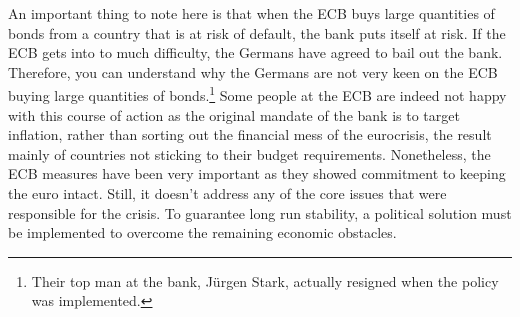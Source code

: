 \documentclass{tufte-handout}
\begin{document}
An important thing to note here is that when the ECB buys large quantities of bonds from a country that is at risk of default, the bank puts itself at risk. 
If the ECB gets into to much difficulty, the Germans have agreed to bail out the bank. 
Therefore, you can understand why the Germans are not very keen on the ECB buying large quantities of bonds.\footnote{Their top man at the bank,  J\"urgen Stark, actually resigned when the policy was implemented.}
Some people at the ECB are indeed not happy with this course of action as the original mandate of the bank is to target inflation, rather than sorting out the financial mess of the eurocrisis, the result mainly of countries not sticking to their budget requirements. 
Nonetheless, the ECB measures have been very important as they showed commitment to keeping the euro intact. 
Still, it doesn't address any of the core issues that were responsible for the crisis.  
To guarantee long run stability, a political solution must be implemented to overcome the remaining economic obstacles. 

\end{document}
